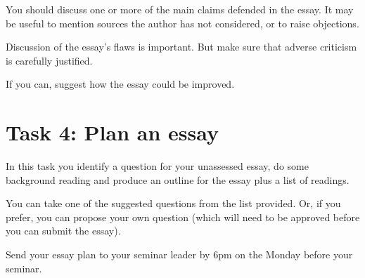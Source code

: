 \documentclass[12pt,\papersize]{extarticle}
\begin{document}
You should discuss one or more of the main claims defended in the essay.  
It may be useful to mention sources the author has not considered, or to raise objections.

Discussion of the essay’s flaws is important.
But make sure that adverse criticism is carefully justified.

If you can, suggest how the essay could be improved.



\section{Task 4: Plan an essay}
In this task you identify a question for your unassessed essay, do some background reading and produce an outline for the essay plus a list of readings.

You can take one of the suggested questions from the list provided.  Or, if you prefer, you can propose your own question (which will need to be approved before you can submit the essay).

Send your essay plan to your seminar leader by 6pm on the Monday before your seminar.







%
\end{document}
